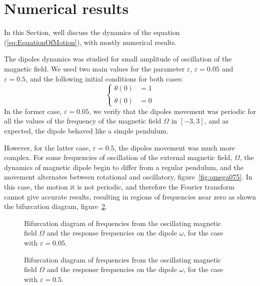 \section{Numerical results}

In this Section, we\textquotesingle ll discuss the dynamics of the equation (\ref{eq:EquationOfMotion}), with mostly numerical results. 

The dipole\textquotesingle s dynamics was studied for small amplitude of oscillation of the magnetic field. We used two main values for the parameter $\varepsilon$, $\varepsilon = 0.05$ and $\varepsilon = 0.5$, and the following initial conditions for both cases:
\begin{equation}
    \begin{cases}
        \theta (0) &= 1\\        
        \dot{\theta}(0) &= 0
    \end{cases}
\end{equation} 
In the former case, $\varepsilon = 0.05$, we verify that the dipole\textquotesingle s movement was periodic for all the values of the frequency of the magnetic field $\Omega$ in $[-3,3]$, and as expected, the dipole behaved like a simple pendulum. 

However, for the latter case, $\varepsilon = 0.5$, the dipole\textquotesingle s movement was much more complex. For some frequencies of oscillation of the external magnetic field, $\Omega$, the dynamics of magnetic dipole begin to differ from a regular pendulum, and the movement alternates between rotational and oscillatory, figure~\ref{fig:omega075}. In this case, the motion it is not periodic, and therefore the Fourier transform cannot give accurate results, resulting in regions of frequencies near zero as shown the bifurcation diagram, figure~\ref{fig:bif05}.


\begin{figure}
    \centering
    \scalebox{0.66}{}
    \caption{Bifurcation diagram of frequencies from the oscillating magnetic field $\Omega$ and the response frequencies on the dipole $\omega$, for the case with $\varepsilon = 0.05$.}
    \label{fig:bif005}
\end{figure}

\begin{figure}
    \centering
    \scalebox{0.66}{}
    \caption{Bifurcation diagram of frequencies from the oscillating magnetic field $\Omega$ and the response frequencies on the dipole $\omega$, for the case with $\varepsilon = 0.5$.}
    \label{fig:bif05}
\end{figure}

